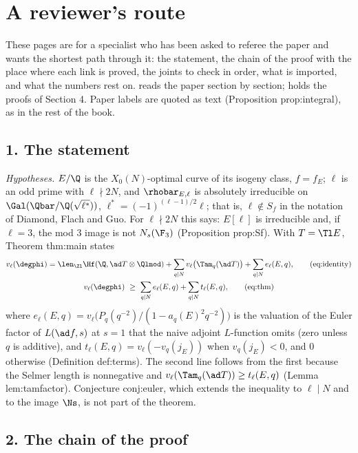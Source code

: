 \chapter*{A reviewer's route}

These pages are for a specialist who has been asked to referee the paper and wants the shortest path through it: the
statement, the chain of the proof with the place where each link is proved, the joints to check in order, what is
imported, and what the numbers rest on.  reads the paper section by section;  holds the
proofs of Section 4. Paper labels are quoted as text (Proposition prop:integral), as in the rest of the book.

\section*{1. The statement}

\emph{Hypotheses.} $E/\Q$ is the $X_0(N)$-optimal curve of its isogeny class, $f=f_E$; $\ell$ is an odd prime with
$\ell\nmid2N$, and $\rhobar_{E,\ell}$ is absolutely irreducible on $\Gal(\Qbar/\Q(\sqrt{\ell^*}))$, $\ell^*=(-1)^{(\ell-1)/2}\ell$;
that is, $\ell\notin S_f$ in the notation of Diamond, Flach and Guo. For $\ell\nmid2N$ this says: $E[\ell]$ is irreducible
and, if $\ell=3$, the mod $3$ image is not $N_s(\F_3)$ (Proposition prop:Sf). With $T=\Tl E$, Theorem thm:main states
\begin{gather*}
v_\ell(\degphi)=\len_{\Zl}\Hf(\Q,\ad T\otimes\Qlmod)+\sum_{q\mid N}v_\ell\bigl(\Tam_q(\ad T)\bigr)+\sum_{q\mid N}e_\ell(E,q),
\tag{eq:identity}\\
v_\ell(\degphi)\ \ge\ \sum_{q\mid N}e_\ell(E,q)+\sum_{q\mid N}t_\ell(E,q),\tag{eq:thm}
\end{gather*}
where $e_\ell(E,q)=v_\ell\bigl(P_q(q^{-2})/(1-a_q(E)^2q^{-2})\bigr)$ is the valuation of the Euler factor of $L(\ad f,s)$ at
$s=1$ that the naive adjoint $L$-function omits (zero unless $q$ is additive), and $t_\ell(E,q)=v_\ell(-v_q(j_E))$ when
$v_q(j_E)<0$, and $0$ otherwise (Definition def:terms). The second line follows from the first because the Selmer length is
nonnegative and $v_\ell(\Tam_q(\ad T))\ge t_\ell(E,q)$ (Lemma lem:tamfactor). Conjecture conj:euler, which extends the
inequality to $\ell\mid N$ and to the image $\Ns$, is not part of the theorem.

\section*{2. The chain of the proof}

